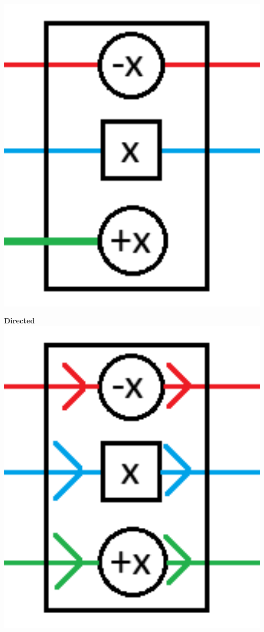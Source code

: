 \documentclass{beamer}
\begin{document}
\begin{frame}
\begin{minipage}[t]{0.32\textwidth}
    \includegraphics[width=1\textwidth]{res/DoorOpenOptional.png}
  \end{minipage}
  \begin{minipage}[t]{0.32\textwidth}
    \textbf{Directed}
    \includegraphics[width=1\textwidth]{res/DoorDirected.png}
  \end{minipage}

\end{frame}
\end{document}
